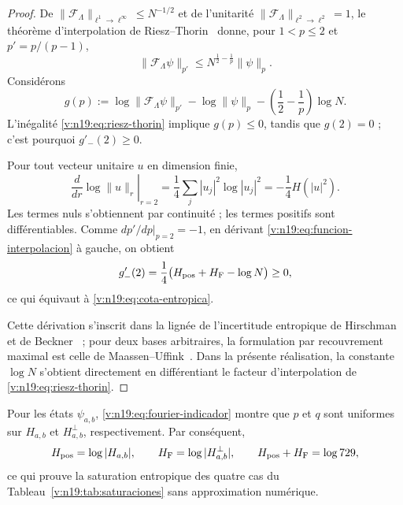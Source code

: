 \begin{proof}
De \(\|\mathcal F_\Lambda\|_{\ell^1\to\ell^\infty}
\le N^{-1/2}\) et de l’unitarité
\(\|\mathcal F_\Lambda\|_{\ell^2\to\ell^2}=1\), le théorème
d’interpolation de Riesz--Thorin~\cite{riesz_1927,thorin_1948} donne, pour
\(1<p\le2\) et \(p'=p/(p-1)\),
\begin{equation}
 \|\mathcal F_\Lambda\psi\|_{p'}
 \le N^{\frac12-\frac1p}\|\psi\|_p.
 \label{v:n19:eq:riesz-thorin}
\end{equation}
Considérons
\begin{equation}
 g(p):=\log\|\mathcal F_\Lambda\psi\|_{p'}
       -\log\|\psi\|_p
       -\left(\frac12-\frac1p\right)\log N.
 \label{v:n19:eq:funcion-interpolacion}
\end{equation}
L’inégalité \eqref{v:n19:eq:riesz-thorin} implique \(g(p)\le0\),
tandis que \(g(2)=0\) ; c’est pourquoi \(g'_-(2)\ge0\).

Pour tout vecteur unitaire \(u\) en dimension finie,
\begin{equation}
 \left.\frac{d}{dr}\log\|u\|_r\right|_{r=2}
 =\frac14\sum_j|u_j|^2\log|u_j|^2
 =-\frac14H(|u|^2).
 \label{v:n19:eq:derivada-norma}
\end{equation}
Les termes nuls s’obtiennent par continuité ; les termes positifs
sont différentiables. Comme \(\left.dp'/dp\right|_{p=2}=-1\), en dérivant
\eqref{v:n19:eq:funcion-interpolacion} à gauche, on obtient
\begin{equation}
 g'_-(2)=\frac14
 \bigl(H_{\rm pos}+H_{\rm F}-\log N\bigr)\ge0,
 \label{v:n19:eq:derivada-entropica}
\end{equation}
ce qui équivaut à \eqref{v:n19:eq:cota-entropica}.

Cette dérivation s’inscrit dans la lignée de l’incertitude entropique de
Hirschman et de Beckner~\cite{hirschman_1957,beckner_1975} ; pour deux bases
arbitraires, la formulation par recouvrement maximal est celle de
Maassen--Uffink~\cite{maassen_uffink_1988}. Dans la présente réalisation,
la constante \(\log N\) s’obtient directement en différentiant le facteur
d’interpolation de \eqref{v:n19:eq:riesz-thorin}.
\end{proof}

Pour les états \(\psi_{a,b}\), \eqref{v:n19:eq:fourier-indicador}
montre que \(p\) et \(q\) sont uniformes sur \(H_{a,b}\) et
\(H_{a,b}^{\perp}\), respectivement. Par conséquent,
\[
 H_{\rm pos}=\log|H_{a,b}|,\qquad
 H_{\rm F}=\log|H_{a,b}^{\perp}|,\qquad
 H_{\rm pos}+H_{\rm F}=\log729,
\]
ce qui prouve la saturation entropique des quatre cas du
Tableau~\ref{v:n19:tab:saturaciones} sans approximation numérique.

